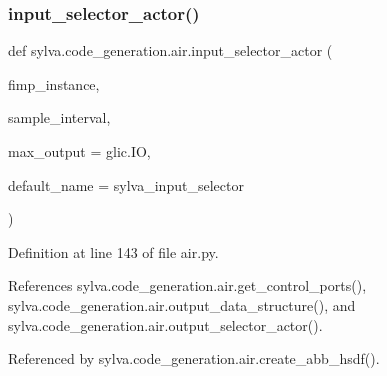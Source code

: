 \subsubsection{\texorpdfstring{input\+\_\+selector\+\_\+actor()}{input\_selector\_actor()}}
{\footnotesize\ttfamily def sylva.\+code\+\_\+generation.\+air.\+input\+\_\+selector\+\_\+actor (\begin{DoxyParamCaption}\item[{}]{fimp\+\_\+instance,  }\item[{}]{sample\+\_\+interval,  }\item[{}]{max\+\_\+output = {\ttfamily glic.IO},  }\item[{}]{default\+\_\+name = {\ttfamily \textquotesingle{}sylva\+\_\+input\+\_\+selector\textquotesingle{}} }\end{DoxyParamCaption})}



Definition at line 143 of file air.\+py.



References sylva.\+code\+\_\+generation.\+air.\+get\+\_\+control\+\_\+ports(), sylva.\+code\+\_\+generation.\+air.\+output\+\_\+data\+\_\+structure(), and sylva.\+code\+\_\+generation.\+air.\+output\+\_\+selector\+\_\+actor().



Referenced by sylva.\+code\+\_\+generation.\+air.\+create\+\_\+abb\+\_\+hsdf().


